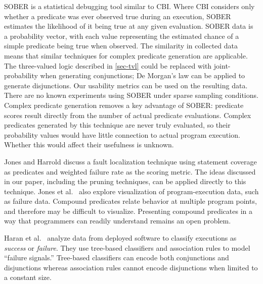 SOBER \cite{1081753} is a statistical debugging tool similar to CBI\@.  Where CBI considers only whether a predicate was ever observed true during an execution, SOBER estimates the likelihood of it being true at any given evaluation.  SOBER data is a probability vector, with each value representing the estimated chance of a simple predicate being true when observed.  The similarity in collected data means that similar techniques for complex predicate generation are applicable.  The three-valued logic described in \autoref{sec-tvl} could be replaced with joint-probability when generating conjunctions; De Morgan's law can be applied to generate disjunctions.  Our usability metrics can be used on the resulting data.  There are no known experiments using SOBER under sparse sampling conditions.  Complex predicate generation removes a key advantage of SOBER: predicate scores result directly from the number of actual predicate evaluations.  Complex predicates generated by this technique are never truly evaluated, so their probability values would have little connection to actual program execution.  Whether this would affect their usefulness is unknown.

Jones and Harrold \cite{1101949} discuss a fault localization technique using statement coverage as predicates and weighted failure rate as the scoring metric.  The ideas discussed in our paper, including the pruning techniques, can be applied directly to this technique.  Jones et al.\ \cite{DBLP:journals/ivs/JonesOH04} also explore visualization of program-execution data, such as failure data.  Compound predicates relate behavior at multiple program points, and therefore may be difficult to visualize.  Presenting compound predicates in a way that programmers can readily understand remains an open problem.

Haran et al.\ \cite{haran05TCEDS} analyze data from deployed software to classify executions as \emph{success} or \emph{failure}.  They use tree-based classifiers and association rules to model ``failure signals.''  Tree-based classifiers can encode both conjunctions and disjunctions whereas association rules cannot encode disjunctions when limited to a constant size.



